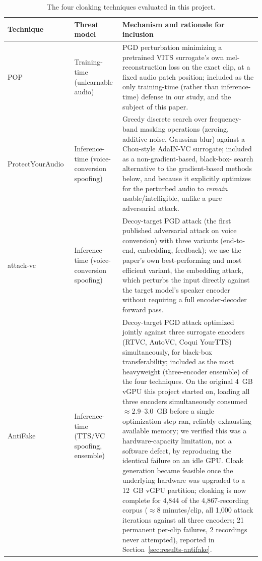 \documentclass[11pt]{article}
\begin{document}
\begin{table}[H]
\centering
\caption{The four cloaking techniques evaluated in this project.}
\label{tab:cloaking}
\begin{tabular}{p{1.8cm}p{2.3cm}p{7.9cm}}
\toprule
Technique & Threat model & Mechanism and rationale for inclusion \\
\midrule
POP~\cite{zhang2024mitigating}
  & Training-time (unlearnable audio)
  & PGD perturbation minimizing a pretrained VITS surrogate's own
    mel-reconstruction loss on the exact clip, at a fixed audio patch
    position; included as the only training-time (rather than
    inference-time) defense in our study, and the subject of this
    paper. \\
ProtectYourAudio~\cite{liu2023protecting}
  & Inference-time (voice-conversion spoofing)
  & Greedy discrete search over frequency-band masking operations
    (zeroing, additive noise, Gaussian blur) against a Chou-style
    AdaIN-VC surrogate; included as a non-gradient-based, black-box-
    search alternative to the gradient-based methods below, and
    because it explicitly optimizes for the perturbed audio to
    \emph{remain} usable/intelligible, unlike a pure adversarial
    attack. \\
attack-vc~\cite{huang2021defending}
  & Inference-time (voice-conversion spoofing)
  & Decoy-target PGD attack (the first published adversarial attack on
    voice conversion) with three variants (end-to-end, embedding,
    feedback); we use the paper's own best-performing and most
    efficient variant, the embedding attack, which perturbs the input
    directly against the target model's speaker encoder without
    requiring a full encoder-decoder forward pass. \\
AntiFake~\cite{yu2023antifake}
  & Inference-time (TTS/VC spoofing, ensemble)
  & Decoy-target PGD attack optimized jointly against three surrogate
    encoders (RTVC, AutoVC, Coqui YourTTS) simultaneously, for
    black-box transferability; included as the most heavyweight
    (three-encoder ensemble) of the four techniques. On the original
    4~GB vGPU this project started on, loading all three encoders
    simultaneously consumed $\approx$2.9--3.0~GB before a single
    optimization step ran, reliably exhausting available memory; we
    verified this was a hardware-capacity limitation, not a software
    defect, by reproducing the identical failure on an idle GPU. Cloak
    generation became feasible once the underlying hardware was
    upgraded to a 12~GB vGPU partition; cloaking is now complete for
    4,844 of the 4,867-recording corpus ($\approx$8 minutes/clip, all
    1,000 attack iterations against all three encoders; 21 permanent
    per-clip failures, 2 recordings never attempted), reported in
    Section~\ref{sec:results-antifake}. \\
\bottomrule
\end{tabular}
\end{table}
\end{document}
